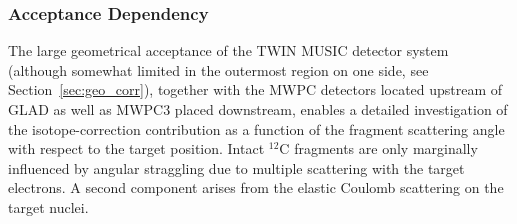 \subsubsection{Acceptance Dependency}
The large geometrical acceptance of the TWIN MUSIC detector system (although somewhat limited in the outermost region on one side, see Section~\ref{sec:geo_corr}), together with the MWPC detectors located upstream of GLAD as well as MWPC3 placed downstream, enables a detailed investigation of the isotope-correction contribution as a function of the fragment scattering angle with respect to the target position.\newline
Intact $^{12}$C fragments are only marginally influenced by angular straggling due to multiple scattering with the target electrons. A second component arises from the elastic Coulomb scattering on the target nuclei. 
